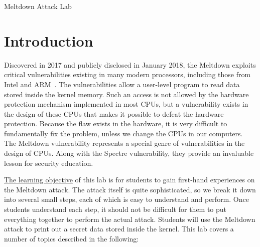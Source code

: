 




\newcommand{\meltdownFigs}{./Figs}




\begin{center}
{\LARGE Meltdown Attack Lab}
\end{center}



\section{Introduction}

Discovered in 2017 and publicly disclosed in January 2018, the Meltdown
exploits critical vulnerabilities existing in many modern processors,
including those from Intel and ARM~\cite{Lipp2018meltdown}. 
The vulnerabilities allow a user-level
program to read data stored inside the kernel memory. Such an access is not
allowed by the hardware protection mechanism implemented in most CPUs, but
a vulnerability exists in the design of these CPUs that makes it possible
to defeat the hardware protection. Because the flaw exists in the hardware,
it is very difficult to fundamentally fix the problem, unless we change the
CPUs in our computers. The Meltdown vulnerability represents a special
genre of vulnerabilities in the design of CPUs. Along with the Spectre
vulnerability, they provide an invaluable lesson for security education.


\underline{The learning objective} of this lab is for students to gain first-hand
experiences on the Meltdown attack. The attack itself is quite
sophisticated, so we break it down into several small steps, each of which
is easy to understand and perform.  Once students understand each step, it
should not be difficult for them to put everything together to perform the
actual attack. Students will use the Meltdown attack to print out a 
secret data stored inside the kernel. This lab covers a number of topics 
described in the following: 

